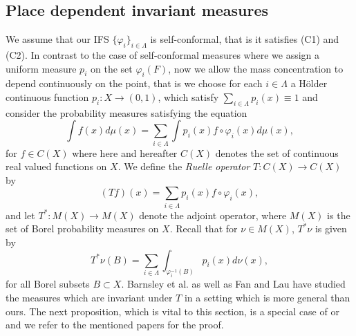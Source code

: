 \documentclass{PRM}
\theoremstyle{plain}
\theoremstyle{definition}
\theoremstyle{remark}
\begin{document}
\subsection{Place dependent invariant measures}
We assume that our IFS $\{\varphi_i\}_{i\in\Lambda}$ is self-conformal, that is it satisfies (C1) and (C2). In contrast to the case of self-conformal measures where we assign a uniform measure $p_i$ on the set $\varphi_i(F)$, now we allow the mass concentration to depend continuously on the point, that is we choose for each $i\in\Lambda$ a Hölder continuous function $p_i\colon X\to (0,1)$, which satisfy $\sum_{i\in\Lambda}p_i(x)\equiv 1$ and consider the probability  measures satisfying the equation
\begin{equation*}
    \int f(x)d\mu(x)=\sum_{i\in\Lambda}\int p_i(x)f\circ \varphi_i(x)d\mu(x),
\end{equation*}
for $f\in C(X)$ where here and hereafter $C(X)$ denotes the set of continuous real valued functions on $X$. We define the \emph{Ruelle operator} $T\colon C(X)\to C(X)$ by
\begin{equation*}
    (Tf)(x)=\sum_{i\in\Lambda}p_i(x)f\circ \varphi_i(x),
\end{equation*}
and let $T^*\colon M(X)\to M(X)$ denote the adjoint operator, where $M(X)$ is the set of Borel probability measures on $X$. Recall that for $\nu\in M(X)$, $T^*\nu$ is given by
\begin{equation*}
    T^*\nu(B)=\sum_{i\in\Lambda}\int_{\varphi_i^{-1}(B)}p_i(x)d\nu(x),
\end{equation*}
for all Borel subsets $B\subset X$. Barnsley et al. \cite{Barn} as well as Fan and Lau \cite{Fan} have studied the measures which are invariant under $T$ in a setting which is more general than ours. The next proposition, which is vital to this section, is a special case of \cite[Theorem 1.1]{Fan} or \cite[Theorem 2.1]{Barn} and we refer to the mentioned papers for the proof.
\end{document}

